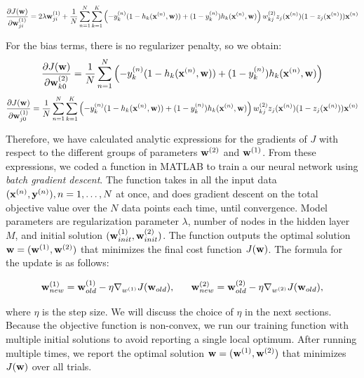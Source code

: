 \begin{equation}
\frac{\partial J(\boldsymbol{\mathbf{w}})}{\partial \boldsymbol{\mathbf{w}}^{(1)}_{ji}} =  2 \lambda \boldsymbol{\mathbf{w}}^{(1)}_{ji}  + \frac{1}{N}\sum_{n=1}^{N} \sum_{k=1}^{K} \left(-y_k^{(n)}(1 - h_k(\boldsymbol{\mathbf{x}}^{(n)},\boldsymbol{\mathbf{w}})) + (1-y_k^{(n)})h_k(\boldsymbol{\mathbf{x}}^{(n)},\boldsymbol{\mathbf{w}}) \right)w_{kj}^{(2)} z_j(\boldsymbol{\mathbf{x}}^{(n)})(1-z_j(\boldsymbol{\mathbf{x}}^{(n)})) \boldsymbol{\mathbf{x}}^{(n)}
\end{equation}

For the bias terms, there is no regularizer penalty, so we obtain:
\begin{equation}
\frac{\partial J(\boldsymbol{\mathbf{w}})}{\partial \boldsymbol{\mathbf{w}}^{(2)}_{k0}} = \frac{1}{N}\sum_{n=1}^{N} \left(-y_k^{(n)}(1 - h_k(\boldsymbol{\mathbf{x}}^{(n)},\boldsymbol{\mathbf{w}})) + (1-y_k^{(n)})h_k(\boldsymbol{\mathbf{x}}^{(n)},\boldsymbol{\mathbf{w}}) \right)
\end{equation}
\begin{equation}
\frac{\partial J(\boldsymbol{\mathbf{w}})}{\partial \boldsymbol{\mathbf{w}}^{(1)}_{j0}} =  \frac{1}{N} \sum_{n=1}^{N} \sum_{k=1}^{K} \left(-y_k^{(n)}(1 - h_k(\boldsymbol{\mathbf{x}}^{(n)},\boldsymbol{\mathbf{w}})) + (1-y_k^{(n)})h_k(\boldsymbol{\mathbf{x}}^{(n)},\boldsymbol{\mathbf{w}}) \right)w_{kj}^{(2)} z_j(\boldsymbol{\mathbf{x}}^{(n)})(1-z_j(\boldsymbol{\mathbf{x}}^{(n)})) \boldsymbol{\mathbf{x}}^{(n)}
\end{equation}

Therefore, we have calculated analytic expressions for the gradients of $J$ with respect to the different groups of parameters $\boldsymbol{\mathbf{w}}^{(2)}$ and $\boldsymbol{\mathbf{w}}^{(1)}$.  From these expressions, we coded a function in MATLAB to train a our neural network using \textit{batch gradient descent}. The function takes in all the input data $(\boldsymbol{\mathbf{x}}^{(n)},\boldsymbol{\mathbf{y}}^{(n)}), n = 1, \ldots, N$ at once, and does gradient descent on the total objective value over the $N$ data points each time, until convergence. Model parameters are regularization parameter $\lambda$, number of nodes in the hidden layer $M$, and initial solution $(\boldsymbol{\mathbf{w}}^{(1)}_{init}, \boldsymbol{\mathbf{w}}^{(2)}_{init})$. The function outputs the optimal solution $\boldsymbol{\mathbf{w}} = (\boldsymbol{\mathbf{w}}^{(1)}, \boldsymbol{\mathbf{w}}^{(2)})$ that minimizes the final cost function $J(\boldsymbol{\mathbf{w}})$. The formula for the update is as follows:

\begin{equation}
\boldsymbol{\mathbf{w}}^{(1)}_{new} = \boldsymbol{\mathbf{w}}^{(1)}_{old} - \eta \nabla_{w^{(1)}}J(\boldsymbol{\mathbf{w}}_{old}),~~~~~~\\
\boldsymbol{\mathbf{w}}^{(2)}_{new} = \boldsymbol{\mathbf{w}}^{(2)}_{old} - \eta \nabla_{w^{(2)}}J(\boldsymbol{\mathbf{w}}_{old}),
\end{equation}


where $\eta$ is the step size.  We will discuss the choice of $\eta$ in the next sections.  Because the objective function is non-convex, we run our training function with multiple initial solutions to avoid reporting a single local optimum.  After running multiple times, we report the optimal solution $\boldsymbol{\mathbf{w}} = (\boldsymbol{\mathbf{w}}^{(1)}, \boldsymbol{\mathbf{w}}^{(2)})$ that minimizes $J(\boldsymbol{\mathbf{w}})$ over all trials. %

